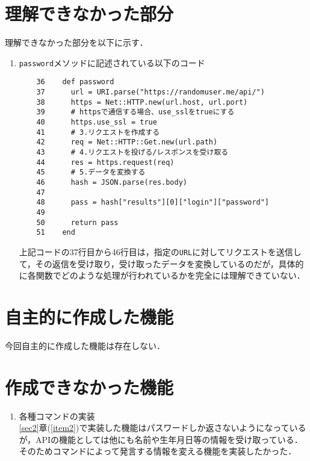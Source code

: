 \documentclass[12pt]{jsarticle}
\begin{document}
\section{理解できなかった部分}\label{sec3}
理解できなかった部分を以下に示す．
\begin{enumerate}
\item \verb|password|メソッドに記述されている以下のコード  
\begin{verbatim}
    36	  def password
    37	    url = URI.parse("https://randomuser.me/api/")
    38	    https = Net::HTTP.new(url.host, url.port)
    39	    # httpsで通信する場合、use_sslをtrueにする
    40	    https.use_ssl = true
    41	    # 3.リクエストを作成する
    42	    req = Net::HTTP::Get.new(url.path)
    43	    # 4.リクエストを投げる/レスポンスを受け取る
    44	    res = https.request(req)
    45	    # 5.データを変換する
    46	    hash = JSON.parse(res.body)
    47	
    48	    pass = hash["results"][0]["login"]["password"] 
    49	
    50	    return pass
    51	  end
\end{verbatim}
上記コードの37行目から46行目は，指定の\verb|URL|に対してリクエストを送信して，その返信を受け取り，受け取ったデータを変換しているのだが，具体的に各関数でどのような処理が行われているかを完全には理解できていない．
\end{enumerate}
   
\section{自主的に作成した機能}\label{sec4}
今回自主的に作成した機能は存在しない．

\section{作成できなかった機能}\label{sec5}
\begin{enumerate}
\item 各種コマンドの実装\\
  \ref{sec2}章(\ref{item2})で実装した機能はパスワードしか返さないようになっているが，APIの機能としては他にも名前や生年月日等の情報を受け取っている．そのためコマンドによって発言する情報を変える機能を実装したかった．
\end{enumerate}


\end{document}
